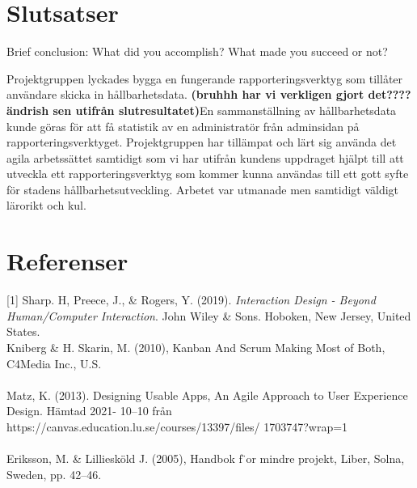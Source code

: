 \documentclass[12pt]{article}
\begin{document}
\section{Slutsatser}
Brief conclusion: What did you accomplish? What made you succeed or not? 

Projektgruppen lyckades bygga en fungerande rapporteringsverktyg som tillåter användare skicka in hållbarhetsdata.
\textbf{(bruhhh har vi verkligen gjort det???? ändrish sen utifrån slutresultatet)}En sammanställning av hållbarhetsdata kunde göras för att få statistik av en administratör från adminsidan på rapporteringsverktyget. Projektgruppen har tillämpat och lärt sig använda det agila arbetssättet samtidigt som vi har utifrån kundens uppdraget hjälpt till att utveckla ett  rapporteringsverktyg som kommer kunna användas till ett gott syfte för stadens hållbarhetsutveckling. Arbetet var utmanade men samtidigt väldigt lärorikt och kul. 

\section{Referenser}
[1] Sharp. H, Preece, J., \& Rogers, Y. (2019). \textit{Interaction Design - Beyond Human/Computer Interaction}. John Wiley \& Sons. Hoboken, New Jersey, United States. \\

\noindent
[2] Kniberg \& H. Skarin, M. (2010), Kanban And Scrum Making Most of Both, C4Media Inc., U.S. \\\\
\noindent
[3] Matz, K. (2013). Designing Usable Apps, An Agile Approach to User Experience Design. Hämtad 2021-
10–10 från https://canvas.education.lu.se/courses/13397/files/
1703747?wrap=1 \\\\
\noindent
[4] Eriksson, M. \& Lilliesköld J. (2005), Handbok f ̈or mindre projekt, Liber, Solna, Sweden, pp. 42–46.

\end{document}

